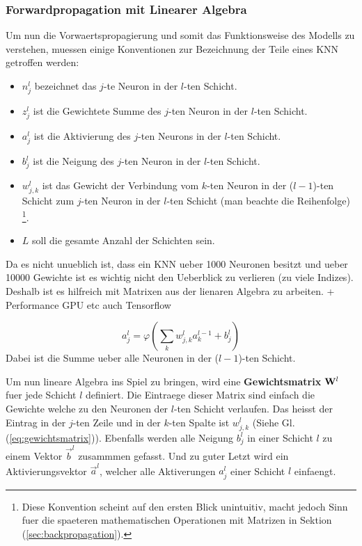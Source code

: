 \documentclass[../main]{subfiles}
\begin{document}
\subsubsection{Forwardpropagation mit Linearer Algebra}
Um nun die Vorwaertspropagierung und somit das Funktionsweise des Modells zu
verstehen, muessen einige Konventionen zur Bezeichnung der Teile eines KNN getroffen werden:
\begin{itemize}

\item{$n_j^l$ bezeichnet das $j$-te Neuron in der $l$-ten Schicht.}
\item{$z_j^l$ ist die Gewichtete Summe des $j$-ten Neuron in der $l$-ten Schicht.}
\item{$a_j^l$ ist die Aktivierung des $j$-ten Neurons in der $l$-ten Schicht.}
\item{$b_j^l$ ist die Neigung des $j$-ten Neuron in der $l$-ten Schicht.}
\item{$w_{j,k}^l$ ist das Gewicht der Verbindung vom $k$-ten Neuron
    in der ($l-1$)-ten Schicht zum $j$-ten Neuron in der $l$-ten Schicht (man
    beachte die Reihenfolge)
    \footnote{
      Diese Konvention scheint auf den ersten Blick unintuitiv, macht jedoch
      Sinn fuer die spaeteren mathematischen Operationen mit Matrizen in Sektion
      (\ref{sec:backpropagation}).
    }.}

\item{$L$ soll die gesamte Anzahl der Schichten sein.}

\end{itemize}

Da es nicht unueblich ist, dass ein KNN ueber 1000 Neuronen besitzt und ueber
10000 Gewichte ist es wichtig nicht den Ueberblick zu verlieren (zu viele Indizes). Deshalb ist es
hilfreich mit Matrixen aus der lienaren Algebra zu arbeiten. + Performance GPU
etc auch Tensorflow

\begin{equation}\label{eq:aktivierung_normal}
  a_j^l = \varphi\left(\sum_k w_{j,k}^l a_k^{l-1} + b_j^l \right)
\end{equation}
Dabei ist die Summe ueber alle Neuronen in der ($l-1$)-ten Schicht.

Um nun lineare Algebra ins Spiel zu bringen, wird eine \textbf{Gewichtsmatrix}
$\mathbf{W}^l$ fuer jede Schicht $l$ definiert.
Die Eintraege dieser Matrix sind einfach die Gewichte welche zu den Neuronen der
$l$-ten Schicht verlaufen. Das heisst der Eintrag in der $j$-ten Zeile und in
der $k$-ten Spalte ist $w_{j,k}^l$ (Siehe Gl. (\ref{eq:gewichtsmatrix})). Ebenfalls werden alle Neigung $b_j^l$ in
einer Schicht $l$ zu einem Vektor $\vec{b}^l$ zusammmen gefasst. Und zu guter
Letzt wird ein Aktivierungsvektor $\vec{a}^l$, welcher alle Aktiverungen $a_j^l$
einer Schicht $l$ einfaengt.
\end{document}
